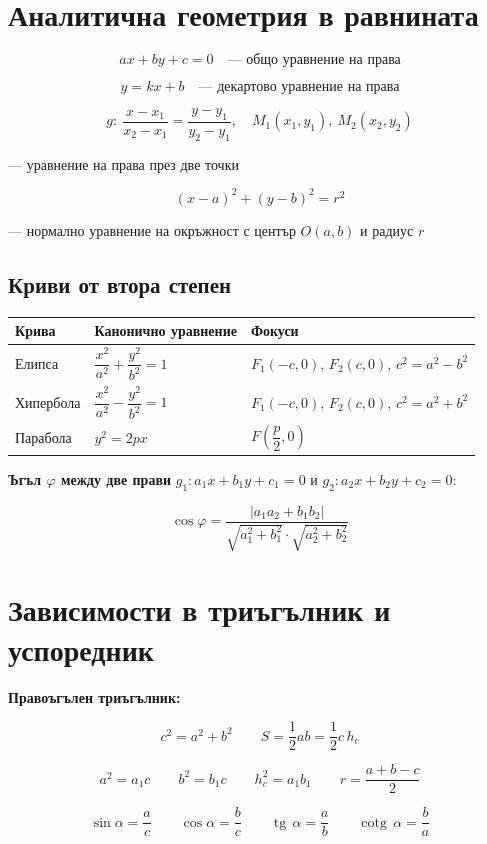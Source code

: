 \documentclass[12pt,a4paper]{article}
\renewcommand{\tg}{\operatorname{tg}}
\newcommand{\cotg}{\operatorname{cotg}}
\begin{document}
\section{Аналитична геометрия в равнината}

$$ax + by + c = 0 \quad \text{— общо уравнение на права}$$

$$y = kx + b \quad \text{— декартово уравнение на права}$$

$$g:\ \frac{x - x_1}{x_2 - x_1} = \frac{y - y_1}{y_2 - y_1},\quad M_1(x_1, y_1),\ M_2(x_2, y_2)$$
\centerline{— уравнение на права през две точки}

$$(x - a)^2 + (y - b)^2 = r^2$$
\centerline{— нормално уравнение на окръжност с център $O(a, b)$ и радиус $r$}

\subsection{Криви от втора степен}

\begin{center}
\begin{tabular}{lll}
\toprule
\textbf{Крива} & \textbf{Канонично уравнение} & \textbf{Фокуси} \\
\midrule
Елипса & $\dfrac{x^2}{a^2} + \dfrac{y^2}{b^2} = 1$ & $F_1(-c,0)$, $F_2(c,0)$, $c^2=a^2-b^2$ \\[10pt]
Хипербола & $\dfrac{x^2}{a^2} - \dfrac{y^2}{b^2} = 1$ & $F_1(-c,0)$, $F_2(c,0)$, $c^2=a^2+b^2$ \\[10pt]
Парабола & $y^2 = 2px$ & $F\left(\dfrac{p}{2},0\right)$ \\[8pt]
\bottomrule
\end{tabular}
\end{center}

\textbf{Ъгъл $\varphi$ между две прави} $g_1: a_1x+b_1y+c_1=0$ и $g_2: a_2x+b_2y+c_2=0$:

$$\cos\varphi = \frac{|a_1a_2+b_1b_2|}{\sqrt{a_1^2+b_1^2}\cdot\sqrt{a_2^2+b_2^2}}$$

\section{Зависимости в триъгълник и успоредник}

\textbf{Правоъгълен триъгълник:}

$$c^2 = a^2+b^2 \qquad S=\frac12 ab=\frac12 c\,h_c$$

$$a^2=a_1c \qquad b^2=b_1c \qquad h_c^2=a_1b_1 \qquad r=\frac{a+b-c}{2}$$

$$\sin\alpha=\frac{a}{c} \qquad \cos\alpha=\frac{b}{c} \qquad \tg\,\alpha=\frac{a}{b} \qquad \cotg\,\alpha=\frac{b}{a}$$
\end{document}
